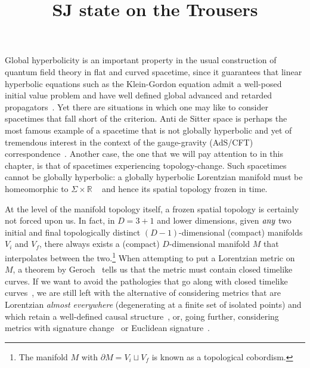 \documentclass[12pt]{article}
\title{SJ state on the Trousers}
\begin{document}
\maketitle

Global hyperbolicity is an important property in the usual construction of quantum field theory in flat and curved spacetime, since it guarantees that linear hyperbolic equations such as the Klein-Gordon equation admit a well-posed initial value problem and have well defined global advanced and retarded propagators~\cite{leray1953hyperbolic,hawking1975large}. Yet there are situations in which one may like to consider spacetimes that fall short of the criterion. Anti de Sitter space is perhaps the most famous example of a spacetime that is not globally hyperbolic and yet of tremendous interest in the context of the gauge-gravity (AdS/CFT) correspondence~\cite{Avis:1977yn}. Another case, the one that we will pay attention to in this chapter, is that of spacetimes experiencing topology-change. Such spacetimes cannot be globally hyperbolic: a globally hyperbolic Lorentzian manifold must be homeomorphic to $\Sigma\times\mathbb R$ ~\cite{Geroch:1970uw} and hence its spatial topology frozen in time.

At the level of the manifold topology itself, a frozen spatial topology is certainly not forced upon us. In fact, in $D=3+1$ and lower dimensions, given $\emph{any}$ two initial and final topologically distinct $(D-1)$-dimensional (compact) manifolds $V_i$ and $V_f$, there always exists a (compact) $D$-dimensional manifold $M$ that interpolates between the two.\footnote{The manifold $M$ with $\partial M = V_i \sqcup V_f$ is known as a topological cobordism.} When attempting to put a Lorentzian metric on $M$, a theorem by Geroch~\cite{Geroch:1967fs} tells us that the metric must contain closed timelike curves. If we want to avoid the %
pathologies that go along with closed timelike curves~\cite{Sorkin:1997gi,thorne1993closed}, we are still left with the alternative of considering metrics that are Lorentzian \emph{almost everywhere} (degenerating at a finite set of isolated points) and which retain a well-defined causal structure~\cite{Sorkin:1989ea}, or, going further, considering metrics with signature change~\cite{Dray:1991zz} or Euclidean signature~\cite{Gibbons:2011dh}.
\end{document}
